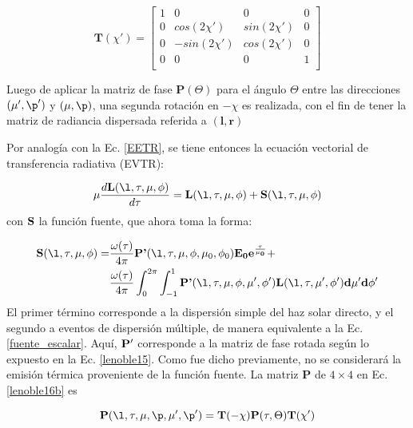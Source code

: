 \begin{equation}
 \textbf{T}(\chi')=
 \begin{bmatrix}
{1} & {0} & {0} & {0}\\
{0} & {cos(2\chi')} & {sin(2\chi')} & {0}\\
{0} & {-sin(2\chi')} & {cos(2\chi')} & {0}\\
{0} & {0} & {0} & {1}\\
  \end{bmatrix}
\label{lenoble15}
\end{equation}

Luego de aplicar la matriz de fase $\textbf{P}(\Theta)$ para el ángulo $\Theta$ entre
las direcciones $(\mu',\p')$ y $(\mu,\p)$, una segunda rotación en $-\chi$ es realizada,
con el fin de tener la matriz de radiancia dispersada referida a $(\textbf{l},\textbf{r})$

Por analogía con la Ec. \eqref{EETR}, se tiene entonces la ecuación vectorial de transferencia radiativa (EVTR):

\begin{equation}
\mu \frac{d \bf{L}(\l,\tau,\mu,\phi)}{d 
\tau}=\bf{L}(\l,\tau,\mu,\phi)+\bf{S}(\l,\tau,\mu,\phi)
\label{lenoble16a}
\end{equation}
con $\bf{S}$ la función fuente, que ahora toma la forma:

\begin{align}
\begin{split}
\textbf{S}(\l,\tau,\mu,\phi) =&\frac{\omega(\tau)}{4 \pi} 
\textbf{P'}(\l,\tau,\mu,\phi,\mu_{0},\phi_{0})  \bf{E}_{0} e^{\frac{\tau}{\mu_0}} 
+\\ &\frac{\omega(\tau)}{4 \pi} \int_{0}^{2\pi} 
\int_{-1}^{1} \textbf{P'}(\l,\tau,\mu,\phi,\mu',\phi') \bf{L}(\l,\tau,\mu',\phi')d\mu'd\phi'
\label{lenoble16b}
\end{split}
\end{align}
El primer término corresponde a la dispersión simple del haz solar directo, y el segundo a eventos de dispersión múltiple, de manera equivalente a la Ec. \eqref{fuente_escalar}. Aquí, $\bf{P'}$ corresponde a la matriz de fase rotada según lo expuesto en la Ec. \eqref{lenoble15}.
Como fue dicho previamente, no se considerará la emisión térmica proveniente de la función fuente. La matriz $\textbf{P}$
de $4 \times 4$ en Ec. \eqref{lenoble16b} es

\begin{equation}
 \textbf{P}(\l,\tau,\mu,\p,\mu',\p')=\textbf{T}(-\chi)\textbf{P}(\tau,\Theta)\textbf{T}(\chi')
\label{lenoble17}
 \end{equation}

